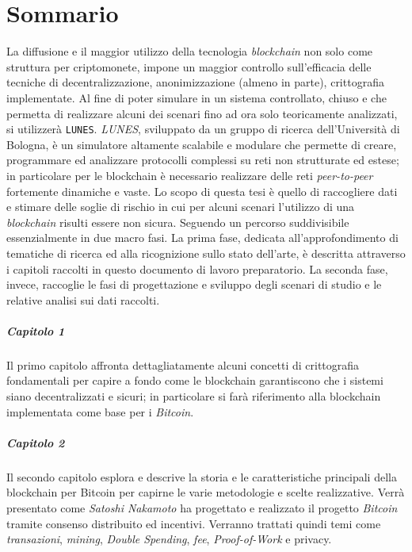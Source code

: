 \chapter*{Sommario}
La diffusione e il maggior utilizzo della tecnologia \textit{blockchain} non solo come struttura per criptomonete, impone un maggior controllo sull'efficacia delle tecniche di decentralizzazione, anonimizzazione (almeno in parte), crittografia implementate.\newline
Al fine di poter simulare in un sistema controllato, chiuso e che permetta di realizzare alcuni dei scenari fino ad ora solo teoricamente analizzati, si utilizzerà \texttt{LUNES}\cite{gdalunes}.\newline
\textit{LUNES}, sviluppato da un gruppo di ricerca dell'Università di Bologna, è un simulatore altamente scalabile e modulare che permette di creare, programmare ed analizzare protocolli complessi su reti non strutturate ed estese; in particolare per le blockchain è necessario realizzare delle reti \textit{peer-to-peer} fortemente dinamiche e vaste.\newline
Lo scopo di questa tesi è quello di raccogliere dati e stimare delle soglie di rischio in cui per alcuni scenari l'utilizzo di una \textit{blockchain} risulti essere non sicura.\newline\newline
Seguendo un percorso suddivisibile essenzialmente in due macro fasi. La prima fase, dedicata all'approfondimento di tematiche di ricerca ed alla ricognizione sullo stato dell'arte, è descritta attraverso i capitoli raccolti in questo documento di lavoro preparatorio. La seconda fase, invece, raccoglie le fasi di progettazione e sviluppo degli scenari di studio e le relative analisi sui dati raccolti.\newline

\paragraph{Capitolo 1}
Il primo capitolo affronta dettagliatamente alcuni concetti di crittografia fondamentali per capire a fondo come le blockchain garantiscono che i sistemi siano decentralizzati e sicuri; in particolare si farà riferimento alla blockchain implementata come base per i \textit{Bitcoin}.

\paragraph{Capitolo 2}
Il secondo capitolo esplora e descrive la storia e le caratteristiche principali della blockchain per Bitcoin per capirne le varie metodologie e scelte realizzative. Verrà presentato come \textit{Satoshi Nakamoto} ha progettato e realizzato il progetto \textit{Bitcoin} tramite consenso distribuito ed incentivi. Verranno trattati quindi temi come \textit{transazioni}, \textit{mining}, \textit{Double Spending}, \textit{fee}, \textit{Proof-of-Work} e privacy.

